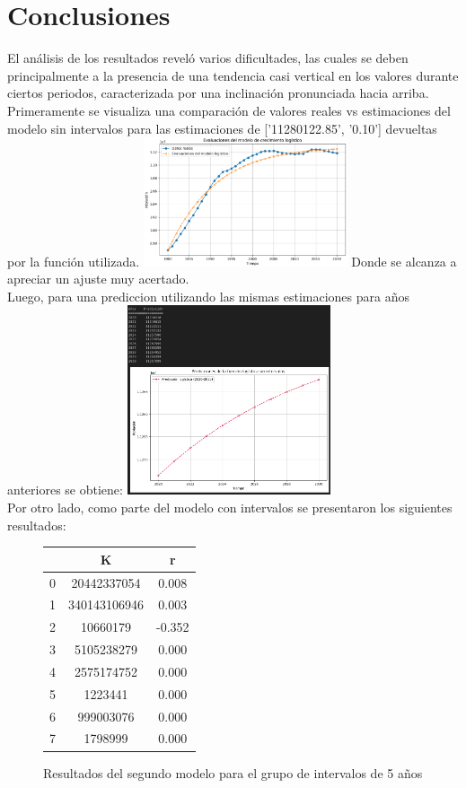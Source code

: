 \documentclass[a4paper,10pt,twocolumn]{article}
\begin{document}
\section{Conclusiones}\label{sec:conc}
El análisis de los resultados reveló varios dificultades, las cuales se deben principalmente a la presencia de una tendencia casi vertical en los valores durante ciertos periodos, caracterizada por una inclinación pronunciada hacia arriba.\\
Primeramente se visualiza una comparación de valores reales vs estimaciones del modelo sin intervalos para las estimaciones de ['11280122.85', '0.10'] devueltas por la función utilizada.
\includegraphics[width=0.45\textwidth]{img/real_vs_pred.png}
Donde se alcanza a apreciar un ajuste muy acertado.\\ 
Luego, para una prediccion utilizando las mismas estimaciones para años anteriores se obtiene:
\includegraphics[width=0.45\textwidth]{img/graph_sin_intervalos.png}
\\
Por otro lado, como parte del modelo con intervalos se presentaron los siguientes resultados:\\
	\begin{figure}[h!]%
		\begin{center}
			\begin{tabular}{|c|c|c|} \hline
			 			& K 			& r 		\\ \hline
			0 			& 20442337054 	& 0.008  	\\ \hline
			1			& 340143106946 	& 0.003 	\\ \hline
			2			& 	  10660179	& -0.352 	\\ \hline
			3 			&   5105238279	&  0.000	\\ \hline
			4 			& 	2575174752	&  0.000 	\\ \hline
			5 			& 	   1223441	&  0.000	\\ \hline
			6 			& 	 999003076	&  0.000 	\\ \hline
			7 			& 	   1798999	&  0.000 	\\ \hline
			\end{tabular}
		\caption{Resultados del segundo modelo para el grupo de intervalos de 5 años \label{fig:ex}}
	\end{center}
\end{figure}
\end{document}
